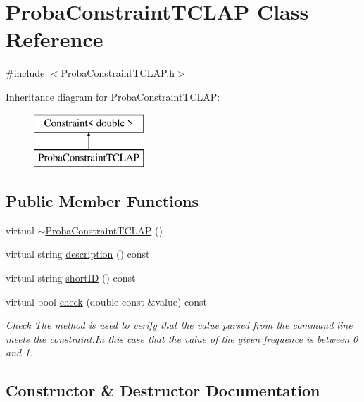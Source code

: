 \hypertarget{class_proba_constraint_t_c_l_a_p}{}\section{Proba\+Constraint\+T\+C\+L\+AP Class Reference}
\label{class_proba_constraint_t_c_l_a_p}


{\ttfamily \#include $<$Proba\+Constraint\+T\+C\+L\+A\+P.\+h$>$}

Inheritance diagram for Proba\+Constraint\+T\+C\+L\+AP\+:\begin{figure}[H]
\begin{center}
\leavevmode
\includegraphics[height=2.000000cm]{class_proba_constraint_t_c_l_a_p}
\end{center}
\end{figure}
\subsection*{Public Member Functions}
\begin{DoxyCompactItemize}
\item 
virtual \hyperlink{class_proba_constraint_t_c_l_a_p_a26f886e90b6795dd2f9ccd650ac34fbd}{$\sim$\+Proba\+Constraint\+T\+C\+L\+AP} ()
\item 
virtual string \hyperlink{class_proba_constraint_t_c_l_a_p_aeda0e4b7aef2a41083e941dc28b5f01a}{description} () const
\item 
virtual string \hyperlink{class_proba_constraint_t_c_l_a_p_aa90cac7ed5ed370fd516b3bf31f2de7d}{short\+ID} () const
\item 
virtual bool \hyperlink{class_proba_constraint_t_c_l_a_p_a803f58f2d4bc602791a3e88739ad1042}{check} (double const \&value) const
\begin{DoxyCompactList}\small\item\em Check The method is used to verify that the value parsed from the command line meets the constraint.\+In this case that the value of the given frequence is between 0 and 1. \end{DoxyCompactList}\end{DoxyCompactItemize}


\subsection{Constructor \& Destructor Documentation}
\hypertarget{class_proba_constraint_t_c_l_a_p_a26f886e90b6795dd2f9ccd650ac34fbd}{}\label{class_proba_constraint_t_c_l_a_p_a26f886e90b6795dd2f9ccd650ac34fbd} 
